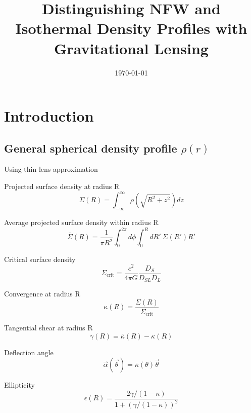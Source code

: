 \documentclass[]{article}
\begin{document}
\title{Distinguishing NFW and Isothermal Density Profiles with Gravitational Lensing}
\author{}
\date{\today}
\maketitle

\begin{abstract}

\end{abstract}

\section{Introduction}

\subsection{General spherical density profile $\rho(r)$}
Using thin lens approximation

Projected surface density at radius R
\begin{equation}
    \Sigma(R) = \int_{-\infty}^{\infty}{\rho(\sqrt{R^2 + z^2}) dz}
\end{equation}

Average projected surface density within radius R
\begin{equation}
    \overline{\Sigma}(R) = \frac{1}{\pi R^2} \int_0^{2\pi}{d\phi \int_0^{R}{dR'~\Sigma(R')R'}}
\end{equation}

Critical surface density
\begin{equation}
    \Sigma_\mathrm{crit} = \frac{c^2}{4\pi G} \frac{D_S}{D_{SL} D_L}
\end{equation}

Convergence at radius R
\begin{equation}
    \kappa(R) = \frac{\Sigma(R)}{\Sigma_\mathrm{crit}}
\end{equation}

Tangential shear at radius R
\begin{equation}
    \gamma(R) = \overline{\kappa}(R) - \kappa(R)
\end{equation}

Deflection angle
\begin{equation}
    \vec{\alpha}(\vec{\theta}) = \overline{\kappa}(\theta)\vec{\theta}
\end{equation}

Ellipticity
\begin{equation}
    \epsilon(R) = \frac{2 \gamma/(1 - \kappa)}{1 + (\gamma/(1 - \kappa))^2}
\end{equation}
\end{document}
